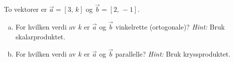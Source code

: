 %
To vektorer er $\vec{a} = [3,\,k]$ og $\vec{b} = [2,\,-1]$.
\begin{enumerate}[a)]
    \item For hvilken verdi av $k$ er $\vec{a}$ og $\vec{b}$ vinkelrette (ortogonale)? \textit{Hint:} Bruk skalarproduktet.
    \item For hvilken verdi av $k$ er $\vec{a}$ og $\vec{b}$ parallelle? \textit{Hint:} Bruk kryssproduktet.
\end{enumerate}

